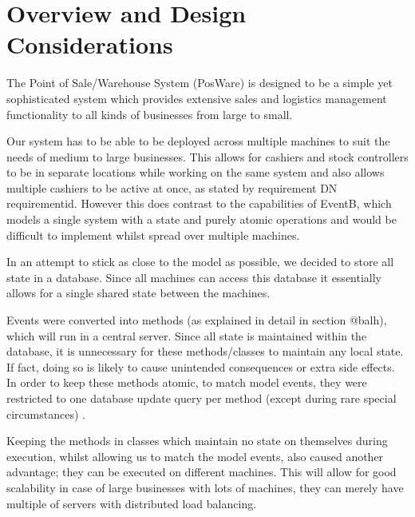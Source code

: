 \documentclass[a4paper]{article}
\begin{document}
\tableofcontents
\pagebreak


\setcounter{page}{1}     %
\renewcommand{\thepage}{\arabic{page}}  %


\section{Overview and Design Considerations}

The Point of Sale/Warehouse System (PosWare) is designed to be a simple yet sophisticated system which provides extensive sales and logistics management functionality to all kinds of businesses from large to small. 

Our system has to be able to be deployed across multiple machines to suit the needs of medium to large businesses. This allows for cashiers and stock controllers to be in separate locations while working on the same system and also allows multiple cashiers to be active at once, as stated by requirement DN requirementid. However this does contrast to the capabilities of EventB, which models a single system with a state and purely atomic operations and would be difficult to implement whilst spread over multiple machines. 

In an attempt to stick as close to the model as possible, we decided to store all state in a database. Since all machines can access this database it essentially allows for a single shared state between the machines.

Events were converted into methods (as explained in detail in section {@balh}), which will run in a central server. Since all state is maintained within the database, it is unnecessary for these methods/classes to maintain any local state. If fact, doing so is likely to cause unintended consequences or extra side effects. In order to keep these methods atomic, to match model events, they were restricted to one database update query per method (except during rare special circumstances) .

Keeping the methods in classes which maintain no state on themselves during execution, whilst allowing us to match the model events, also caused another advantage; they can be executed on different machines. This will allow for good scalability in case of large businesses with lots of machines, they can merely have multiple of servers with distributed load balancing. 
\end{document}
